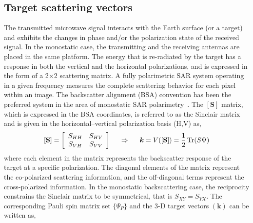 \subsection{Target scattering vectors}\label{sec:scattering-target-vectors}
The transmitted microwave signal interacts with the Earth surface (or a target) and exhibits the changes in phase and/or the polarization state of the received signal. In the monostatic case, the transmitting and the receiving antennas are placed in the same platform. The energy that is re-radiated by the target has a response in both the vertical and the horizontal polarizations, and is expressed in the form of a 2$\times$2 scattering matrix. A fully polarimetric SAR system operating in a given frequency measures the complete scattering behavior for each pixel within an image. The backscatter alignment (BSA) convention has been the preferred system in the area of monostatic SAR polarimetry~\citep{van1990imaging,ulaby1990radar}. The $\mathbf{[S]}$ matrix, which is expressed in the BSA coordinates, is referred to as the Sinclair matrix~\citep{sinclair1950transmission,kennaugh1952effects,ulaby1990radar,zebker1991imaging,guissard1994mueller,boerner1997polarimetry} and is given in the horizontal–vertical polarization basis (H,V) as,
\begin{equation}
\mathbf{[S]}=
\left[\begin{array}{cc}
S_{HH} & S_{HV}\\
S_{VH} & S_{VV}
\end{array}\right] \hspace{0.5cm} \Rightarrow \hspace{0.5cm}
\bm{k}=V(\mathbf{[S]})=\frac{1}{2}\operatorname{Tr}(S\Psi)
\label{Eq:scattering_matrix}
\end{equation}
where each element in the matrix represents the backscatter response of the target at a specific polarization. The diagonal elements of the matrix represent the co-polarized scattering information, and the off-diagonal terms represent the cross-polarized information. In the monostatic backscattering case, the reciprocity constrains the Sinclair matrix to be symmetrical, that is $S_{XY} =S_{YX}$. The corresponding Pauli spin matrix set $\{\Psi_P\}$ and the 3-D target vectors $(\bm{k})$ can be written as, 

